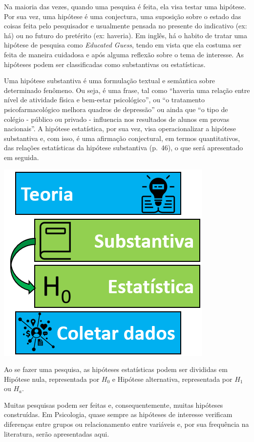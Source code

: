 \documentclass[
]{book}
\begin{document}
Na maioria das vezes, quando uma pesquisa é feita, ela visa testar uma hipótese. Por sua vez, uma hipótese é uma conjectura, uma suposição sobre o estado das coisas feita pelo pesquisador e usualmente pensada no presente do indicativo (ex: há) ou no futuro do pretérito (ex: haveria). Em inglês, há o habito de tratar uma hipótese de pesquisa como \emph{Educated Guess}, tendo em vista que ela costuma ser feita de maneira cuidadosa e após alguma reflexão sobre o tema de interesse. As hipóteses podem ser classificadas como substantivas ou estatísticas.

Uma hipótese substantiva é uma formulação textual e semântica sobre determinado fenômeno. Ou seja, é uma frase, tal como ``haveria uma relação entre nível de atividade física e bem-estar psicológico'', ou ``o tratamento psicofarmacológico melhora quadros de depressão'' ou ainda que ``o tipo de colégio - público ou privado - influencia nos resultados de alunos em provas nacionais''. A hipótese estatística, por sua vez, visa operacionalizar a hipótese substantiva e, com isso, é uma afirmação conjectural, em termos quantitativos, das relações estatísticas da hipótese substantiva (p.~46), o que será apresentado em seguida.

\includegraphics{./img/cap_inferencia_tipos_hipoteses.png}

Ao se fazer uma pesquisa, as hipóteses estatísticas podem ser divididas em Hipótese nula, representada por \(H_0\) e Hipótese alternativa, representada por \(H_1\) ou \(H_a\).

Muitas pesquisas podem ser feitas e, consequentemente, muitas hipóteses construídas. Em Psicologia, quase sempre as hipóteses de interesse verificam diferenças entre grupos ou relacionamento entre variáveis e, por sua frequência na literatura, serão apresentadas aqui.
\end{document}
